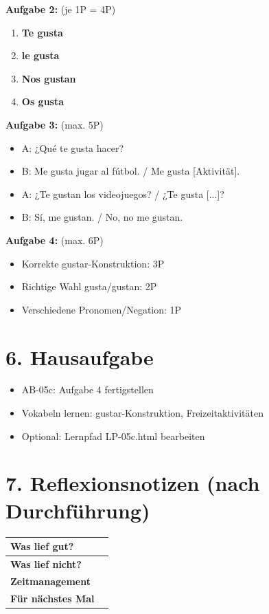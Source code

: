 \documentclass[11pt, a4paper]{article}
\newcommand{\loesung}[1]{\textcolor{loesung}{\textbf{#1}}}
\begin{document}
\textbf{Aufgabe 2:} (je 1P = 4P)
\begin{enumerate}[label=\alph*)]
    \item \loesung{Te gusta}
    \item \loesung{le gusta}
    \item \loesung{Nos gustan}
    \item \loesung{Os gusta}
\end{enumerate}

\textbf{Aufgabe 3:} (max. 5P)
\begin{itemize}
    \item A: ¿Qué te gusta hacer?
    \item B: Me gusta jugar al fútbol. / Me gusta [Aktivität].
    \item A: ¿Te gustan los videojuegos? / ¿Te gusta [...]?
    \item B: Sí, me gustan. / No, no me gustan.
\end{itemize}

\textbf{Aufgabe 4:} (max. 6P)
\begin{itemize}
    \item Korrekte gustar-Konstruktion: 3P
    \item Richtige Wahl gusta/gustan: 2P
    \item Verschiedene Pronomen/Negation: 1P
\end{itemize}


\section*{6. Hausaufgabe}

\begin{itemize}
    \item AB-05c: Aufgabe 4 fertigstellen
    \item Vokabeln lernen: gustar-Konstruktion, Freizeitaktivitäten
    \item Optional: Lernpfad LP-05c.html bearbeiten
\end{itemize}


\section*{7. Reflexionsnotizen (nach Durchführung)}

\begin{tabularx}{\textwidth}{|l|X|}
\hline
\textbf{Was lief gut?} & \\[2em]
\hline
\textbf{Was lief nicht?} & \\[2em]
\hline
\textbf{Zeitmanagement} & \\[2em]
\hline
\textbf{Für nächstes Mal} & \\[2em]
\hline
\end{tabularx}
\end{document}
